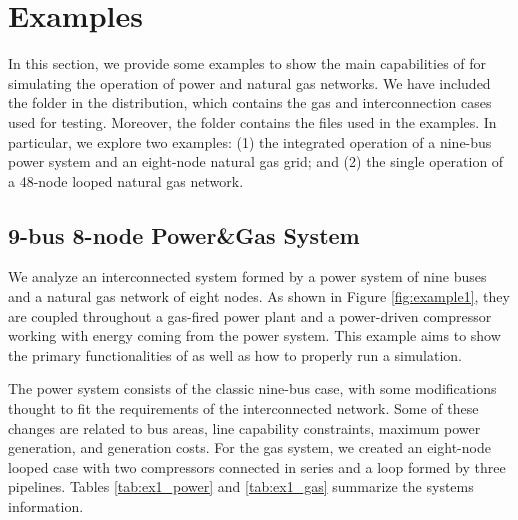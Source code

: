 \chapter{Examples}
\label{chap:examples}
In this section, we provide some examples to show the main capabilities of \mpng{} for simulating the operation of power and natural gas networks. We have included the folder \mpngcasepath{} in the distribution, which contains the gas and interconnection cases used for testing. Moreover, the folder \mpngexamplepath{} contains the files used in the examples. In particular, we explore two examples: (1) the integrated operation of a nine-bus power system  and an eight-node natural gas grid; and (2) the single operation of a 48-node looped natural gas network.

\section{9-bus 8-node Power\&Gas System}
\label{sec:8-9_gas_power}

We analyze an interconnected system formed by a power system of nine buses  and a natural gas network of eight nodes. As shown in Figure \ref{fig:example1}, they are coupled throughout a gas-fired power plant and a power-driven compressor working with energy coming from the power system. This example aims to show the primary functionalities of \mpng{} as well as how to properly run a simulation. 

The power system consists of the classic \matpower{} nine-bus case, with some modifications thought to fit the requirements of the interconnected network. Some of these changes are related to bus areas, line capability constraints, maximum power generation, and generation costs. For the gas system, we created an eight-node looped case with two compressors connected in series and a loop formed by three pipelines. Tables \ref{tab:ex1_power} and \ref{tab:ex1_gas} summarize the systems information. 

